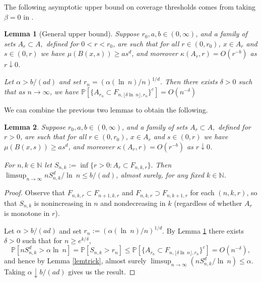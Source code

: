 \documentclass[12pt]{article}
\newcommand{\N}{\mathbb{N}}
\renewcommand{\Pr}{\mathbb{P}}
\renewcommand{\log}{{\ln \:}}
\newtheorem{lemm}{Lemma}
\begin{document}
The following asymptotic upper bound on coverage thresholds comes from
taking $\beta =0$ in
\cite[Lemma 6.3]{MPCov}.



\begin{lemm}[General upper bound]
\label{lemmeta}
Suppose $r_0, a, b \in (0,\infty)$,  and
 a family of sets  $A_r \subset A,$ defined for $0 < r < r_0$,
        are
         such that  for all $r \in (0,r_0)$, $x \in A_r$ and
 $s \in (0,r)$ we have $\mu(B(x,s)) \geq a s^d$, and
moreover $\kappa(A_r,r) = O(r^{-b})$ as $r \downarrow 0$.


	Let $\alpha > b/(ad)
	$ and set $r_n = (\alpha (\log n)/n)^{1/d}$.
 Then there exists $\delta >0$ such that
as $n \to \infty$, we have
$
\Pr[\{A_{r_n} \subset F_{n,\lfloor \delta \log n \rfloor,r_n} \}^c ]
 = O(n^{-\delta})
$
\end{lemm}

We can combine the previous two lemmas to obtain the following.
\begin{lemm}
	\label{l:Sn}
Suppose $r_0, a, b \in (0,\infty)$,  and
 a family of sets  $A_r \subset A,$ defined for $r >0$,
        are
         such that  for all $r \in (0,r_0)$, $x \in A_r$ and
 $s \in (0,r)$ we have $\mu(B(x,s)) \geq a s^d$, and
moreover $\kappa(A_r,r) = O(r^{-b})$ as $r \downarrow 0$.

	For $n,k \in \N$ let $S_{n,k}:= \inf\{r >0: A_r \subset F_{n,k,r}\}.$
	Then
	$\limsup_{n \to \infty} 
	nS_{n,k}^d/\log n \leq b/(ad)$,
	almost surely,
	for any fixed $k \in \N$. 
\end{lemm}
\begin{proof}
	Observe that 
	$F_{n,k,r} \subset F_{n+1,k,r}$
	and
	$F_{n,k,r} \supset F_{n,k+1,r}$
	for each $(n,k,r)$, so that
	 $S_{n,k}$ is nonincreasing in $n$
	and nondecreasing in $k$ (regardless of whether $A_r$ is monotone
	in $r$).

	Let $\alpha > b/(ad)$ and set $r_n := ( \alpha (\log n)/n)^{1/d}$.
	By Lemma \ref{lemmeta} there exists $\delta > 0$
	such that for $n \geq e^{k/\delta}$,
	$$
	\Pr[n S_{n,k}^d > \alpha \log n] = \Pr[S_{n,k} > r_n]
	\leq \Pr[\{ A_{r_n} \subset F_{n, \lfloor \delta \log n \rfloor,r_n}
	\}^c] 
	= O(n^{-\delta}),
	$$
	and hence by Lemma \ref{lemtrick}, 
	almost surely $\limsup_{n \to \infty} (n S_{n,k}^d/\log n) \leq \alpha$.
	Taking $\alpha \downarrow b/(ad)$ gives us the result.
\end{proof}
\end{document}
